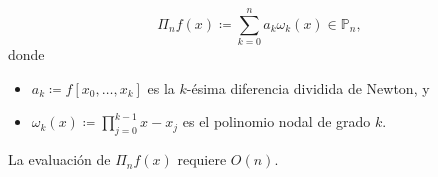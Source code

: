 \begin{frame}



	\begin{definition}
		\begin{equation*}
			\Pi_{n}
			f\left(x\right)\coloneqq
			\sum\limits_{k=0}^{n}
			a_{k}
			\omega_{k}\left(x\right)\in\mathbb{P}_{n},
		\end{equation*}
		donde
		\begin{itemize}
			\item

			      \begin{math}
				      a_{k}\coloneqq
				      f\left[x_{0},\ldots,x_{k}\right]
			      \end{math}
			      es la \alert{$k$-ésima diferencia dividida de Newton}, y

			\item

			      \begin{math}
				      \omega_{k}
				      \left(x\right)\coloneqq
				      \prod\limits_{j=0}^{k-1}
				      x-x_{j}
			      \end{math}
			      es el \alert{polinomio nodal de grado $k$}.
		\end{itemize}
		La evaluación de $\Pi_{n}f\left(x\right)$ requiere
		$O\left(n\right)$.
	\end{definition}
\end{frame}

